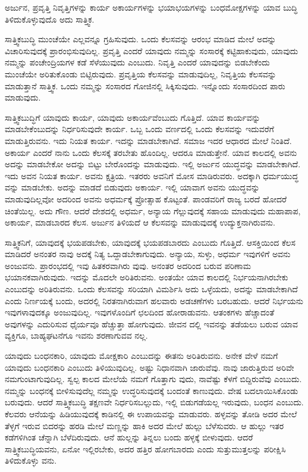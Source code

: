 {\small ಅರ್ಜುನ, ಪ್ರವೃತ್ತಿ ನಿವೃತ್ತಿಗಳನ್ನು ಕಾರ್ಯ ಅಕಾರ್ಯಗಳನ್ನು ಭಯಾಭಯಗಳನ್ನು ಬಂಧಮೋಕ್ಷಗಳನ್ನು ಯಾವ ಬುದ್ಧಿ ತಿಳಿದುಕೊಳ್ಳುವುದೊ ಅದು ಸಾತ್ತ್ವಿಕ.}

ಸಾತ್ತ್ವಿಕಬುದ್ಧಿ ಮುಂಚೆಯೇ ಎಲ್ಲವನ್ನೂ ಗ್ರಹಿಸುವುದು. ಒಂದು ಕೆಲಸವನ್ನು ಆರಂಭ ಮಾಡಿದ ಮೇಲೆ ಅದನ್ನು ವಿಚಾರಿಸುವುದಕ್ಕೆ ಪ್ರಾರಂಭಿಸುವುದಿಲ್ಲ. ಪ್ರವೃತ್ತಿ ಎಂದರೆ ಯಾವುದು ನಮ್ಮನ್ನು ಸಂಸಾರಕ್ಕೆ ಕಟ್ಟಿಹಾಕುವುದು, ಯಾವುದು ನಮ್ಮನ್ನು ಪಂಚೇಂದ್ರಿಯಗಳ ಕಡೆ ಸೆಳೆಯುವುದು ಎಂಬುದು. ನಿವೃತ್ತಿ ಎಂದರೆ ಯಾವುದನ್ನು ಬಿಡಬೇಕೆಂದು ಮುಂಚೆಯೇ ಅರಿತುಕೊಂಡು ಬಿಟ್ಟಿರುವುದು. ಪ್ರವೃತ್ತಿಯ ಕೆಲಸವನ್ನು ಮಾಡುವುದಿಲ್ಲ, ನಿವೃತ್ತಿಯ ಕೆಲಸವನ್ನು ಮಾಡುತ್ತಾನೆ ಸಾತ್ತ್ವಿಕ. ಒಂದು ನಮ್ಮನ್ನು ಸಂಸಾರದ ಗೋಜಿನಲ್ಲಿ ಸಿಕ್ಕಿಸುವುದು. ಇನ್ನೊಂದು ಸಂಸಾರದಿಂದ ಪಾರು ಮಾಡುವುದು.

ಸಾತ್ತ್ವಿಕಬುದ್ಧಿಗೆ ಯಾವುದು ಕಾರ್ಯ, ಯಾವುದು ಅಕಾರ್ಯವೆಂಬುದು ಗೊತ್ತಿದೆ. ಯಾವ ಕಾರ್ಯವನ್ನು ಮಾಡಬೇಕೆಂಬುದನ್ನು ನಿರ್ಧರಿಸುವುದೇ ಕಾರ್ಯ. ಒಬ್ಬ ಒಂದು ವರ್ಣದಲ್ಲಿ ಒಂದು ಕೆಲಸವನ್ನು ಇದುವರೆಗೆ ಮಾಡುತ್ತಿರುವನು. ಇದು ನಿಯತ ಕಾರ್ಯ. ಇದನ್ನು ಮಾಡಬೇಕಾಗಿದೆ. ಸಮಾಜ ಇದರ ಆಧಾರದ ಮೇಲೆ ನಿಂತಿದೆ. ಅಕಾರ್ಯ ಎಂದರೆ ನಾನು ಒಂದು ಕೆಲಸಕ್ಕೆ ತರಬೇತು ಹೊಂದಿಲ್ಲ. ಆದರೂ ಮಾಡುತ್ತೇನೆ. ಯಾವ ಕಾಲದಲ್ಲಿ ಅವನು ಅದನ್ನು ಮಾಡಬೇಕೋ ಅದನ್ನು ಬಿಟ್ಟು ಬೇರೊಂದನ್ನು ಮಾಡುವುದು. ಇಲ್ಲಿ ಅರ್ಜುನ ಯುದ್ಧವನ್ನು ಮಾಡಬೇಕಾಗಿದೆ. ಇದು ಅವನ ನಿಯತ ಕಾರ್ಯ. ಅವನು ಕ್ಷತ್ರಿಯ. ಇತರರು ಅವನಿಗೆ ಮೋಸ ಮಾಡಿರುವರು. ಅದಕ್ಕಾಗಿ ಧರ್ಮಯುದ್ಧ ವನ್ನು ಮಾಡಬೇಕು. ಅದನ್ನು ಮಾಡದೆ ಬಿಡುವುದು ಅಕಾರ್ಯ. ಇಲ್ಲಿ ಯಾವಾಗ ಅವನು ಯುದ್ಧವನ್ನು ಮಾಡುವುದಿಲ್ಲವೋ ಅದರಿಂದ ಅವನು ಅಧರ್ಮಕ್ಕೆ ಪ್ರೋತ್ಸಾಹ ಕೊಟ್ಟಂತೆ. ಪಾಂಡವರಿಗೆ ರಾಜ್ಯ ಬರದೆ ಹೋದರೆ ಚಿಂತೆಯಿಲ್ಲ. ಅದು ಗೌಣ. ಆದರೆ ದೇಶದಲ್ಲಿ ಅಧರ್ಮ, ಅನ್ಯಾಯ ಗೆಲ್ಲುವುದಕ್ಕೆ ಸಹಾಯ ಮಾಡುವುದು ಮಹಾಪಾಪ, ಅಕಾರ್ಯ, ಮಾಡಬಾರದ ಕೆಲಸ. ಅರ್ಜುನ ತಿಳಿಯದೆ ಆ ಕೆಲಸವನ್ನು ಮಾಡುವುದಕ್ಕೆ ಉದ್ಯುಕ್ತನಾಗಿರುವನು.

ಸಾತ್ತ್ವಿಕನಿಗೆ, ಯಾವುದಕ್ಕೆ ಭಯಪಡಬೇಕು, ಯಾವುದಕ್ಕೆ ಭಯಪಡಬಾರದು ಎಂಬುದು ಗೊತ್ತಿದೆ. ಆಸಕ್ತಿಯಿಂದ ಕೆಲಸ ಮಾಡಿದರೆ ಅನಂತರ ನಾವು ಅದಕ್ಕೆ ನಿತ್ಯ ಒದ್ದಾಡಬೇಕಾಗುವುದು. ಅನ್ಯಾಯ, ಸುಳ್ಳು, ಅಧರ್ಮ ಇವುಗಳಿಗೆ ಅವನು ಅಂಜುವನು. ಪ್ರಾರಂಭದಲ್ಲಿ ಇವು ಹಿತಕರವಾಗಿರು ವುವು. ಅನಂತರ ಅದರಿಂದ ಬರುವ ಪರಿಣಾಮ ಭಯಾನಕವಾಗಿರುವುದು. ಇದನ್ನು ಮೊದಲೇ ಅರಿತಿರುವನು. ಅಂತಯೇ ಯಾವ ಕಾಲದಲ್ಲಿ ನಿರ್ಭಯನಾಗಿರಬೇಕು ಎಂಬುದನ್ನು ಅರಿತಿರುವನು. ಒಂದು ಕೆಲಸವನ್ನು ಸರಿಯಾಗಿ ವಿಮರ್ಶಿಸಿ ಅದು ಒಳ್ಳೆಯದು, ಅದನ್ನು ಮಾಡಬೇಕಾಗಿದೆ ಎಂದು ನಿರ್ಣಯಕ್ಕೆ ಬಂದು, ಅದರಲ್ಲಿ ನಿರತನಾಗಿರುವಾಗ ಹಲವಾರು ಅಡಚಣೆಗಳು ಬರಬಹುದು. ಆದರೆ ನಿರ್ಭಯನು ಇವುಗಳಾವುದಕ್ಕೂ ಅಂಜುವುದಿಲ್ಲ. ಇವುಗಳೊಂದಿಗೆ ಛಲದಿಂದ ಹೋರಾಡುವನು. ಆತಂಕಗಳು ಹೆಚ್ಚಾದಂತೆ ಅವುಗಳನ್ನು ಎದುರಿಸುವ ಧೈರ್ಯವೂ ಹೆಚ್ಚುತ್ತಾ ಹೋಗುವುದು. ಜೀವನ ದಲ್ಲಿ ಇವನನ್ನು ತಡೆಯಲು ಬರುವ ಯಾವ ವ್ಯಕ್ತಿಗೂ, ಬಾಹ್ಯಘಟನೆಗೂ ಇವನು ಶರಣಾಗುವವ ನಲ್ಲ.

ಯಾವುದು ಬಂಧನಕಾರಿ, ಯಾವುದು ಮೋಕ್ಷಕಾರಿ ಎಂಬುದನ್ನು ಈತನು ಅರಿತಿರುವನು. ಅನೇಕ ವೇಳೆ ನಮಗೆ ಯಾವುದು ಬಂಧನಕಾರಿ ಎಂಬುದು ತಿಳಿಯುವುದಿಲ್ಲ. ಅಷ್ಟು ನಿಧಾನವಾಗಿ ಜಾರುವೆವು. ನಾವು ಜಾರುತ್ತಿರುವ ಅರಿವೇ ನಮಗುಂಟಾಗುವುದಿಲ್ಲ. ಸ್ವಲ್ಪ ಕಾಲದ ಮೇಲೆಯೆ ನಮಗೆ ಗೊತ್ತಾಗು ವುದು, ನಾವೆಷ್ಟು ಕೆಳಗೆ ಬಿದ್ದಿರುವೆವು ಎಂಬುದು. ನಮ್ಮನ್ನು ಬಂಧನಕ್ಕೆ ಬೀಳಿಸುವುದೆಲ್ಲ ನಮ್ಮನ್ನು ಉದ್ಧರಿಸುವುದಕ್ಕೆ ಬಂದಂತೆ ಕಾಣುವುದು. ವೇಷ ಬದಲಾಯಿಸಿಕೊಂಡು ಬರುವುದು. ಆದರೆ ಸಾತ್ತ್ವಿಕಬುದ್ಧಿ ತಕ್ಷಣವೇ ನಿರ್ಧರಿಸಬಲ್ಲುದು, ಇಲ್ಲಿ ಬಿಡುಗಡೆಯಲ್ಲ ಇರುವುದು, ಬಂಧನ ಎಂಬುದು. ಕೆಲವರು ಆನೆಯನ್ನು ಹಿಡಿಯುವುದಕ್ಕೆ ಕಾಡಿನಲ್ಲಿ ಈ ಉಪಾಯವನ್ನು ಮಾಡುವರು. ಹಳ್ಳವನ್ನು ತೋಡಿ ಅದರ ಮೇಲೆ ತೆಳ್ಳಗೆ ಇರುವ ಬಿದರನ್ನು ಹರಡಿ ಮೇಲೆ ಮಣ್ಣನ್ನು ಹಾಕಿ ಅದರ ಮೇಲೆ ಹುಲ್ಲು ಬೆಳೆಸುವರು. ಆ ಹುಲ್ಲು ಇತರ ಕಡೆಗಳಿಗಿಂತ ಚೆನ್ನಾಗಿ ಬೆಳೆದಿರುವುದು. ಆನೆ ಹುಲ್ಲನ್ನು ತಿನ್ನಲು ಬಂದು ಹಳ್ಳಕ್ಕೆ ಬೀಳುವುದು. ಆದರೆ ಸಾತ್ತ್ವಿಕಬುದ್ಧಿಯವನು, ಏನೋ ಇಲ್ಲಿರಬೇಕು, ಅದರ ಹತ್ತಿರ ಹೋಗಬಾರದು ಎಂದು ಸುತ್ತುಮುತ್ತಲನ್ನು ಪರೀಕ್ಷಿಸಿ ತಿಳಿದುಕೊಳ್ಳು ವನು.

